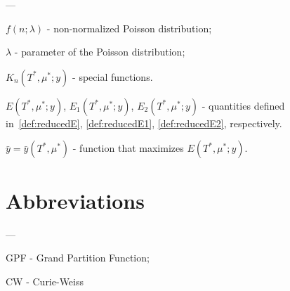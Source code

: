 ---

$f(n; \lambda)$ - non-normalized Poisson distribution;

$\lambda$ - parameter of the Poisson distribution;

$K_n(T^*,\mu^*;y)$ - special functions.

$E(T^*,\mu^*;y)$, $E_1(T^*,\mu^*;y)$, $E_2(T^*,\mu^*;y)$ - quantities defined in~\eqref{def:reducedE}, \eqref{def:reducedE1}, \eqref{def:reducedE2}, respectively.

$\bar{y} = \bar{y}(T^*,\mu^*)$ - function that maximizes $E(T^*,\mu^*;y)$.



\section*{Abbreviations}
---

GPF - Grand Partition Function;

CW - Curie-Weiss